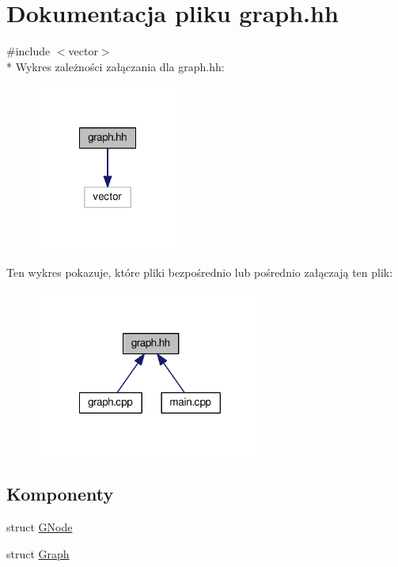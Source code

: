 \hypertarget{graph_8hh}{\section{Dokumentacja pliku graph.\-hh}
\label{graph_8hh}
}
{\ttfamily \#include $<$vector$>$}\\*
Wykres zależności załączania dla graph.\-hh\-:\nopagebreak
\begin{figure}[H]
\begin{center}
\leavevmode
\includegraphics[width=132pt]{graph_8hh__incl}
\end{center}
\end{figure}
Ten wykres pokazuje, które pliki bezpośrednio lub pośrednio załączają ten plik\-:\nopagebreak
\begin{figure}[H]
\begin{center}
\leavevmode
\includegraphics[width=213pt]{graph_8hh__dep__incl}
\end{center}
\end{figure}
\subsection*{Komponenty}
\begin{DoxyCompactItemize}
\item 
struct \hyperlink{struct_g_node}{G\-Node}
\item 
struct \hyperlink{struct_graph}{Graph}
\end{DoxyCompactItemize}

